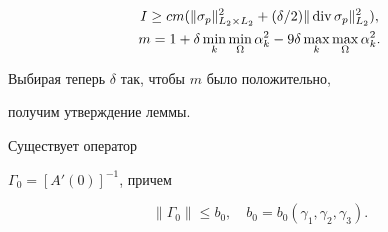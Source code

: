 \begin{pf}
\begin{gather*}
I \ge c m (\| \sigma_p \|^2_{L_2 \times L_2} + 


(\delta /2) \|\divv \sigma_p \|^2_{L_2} ),\\


m = 1 + \delta \min _k \min_ \Omega \alpha ^2_k 


- 9 \delta \max _k \max_ \Omega \alpha ^2_k. 


\end{gather*}


Выбирая теперь $ \delta $ так, чтобы $m$ было положительно,


получим утверждение леммы.


\end{pf}





\begin{lem} 


\label{Gamma0}


Существует оператор 


$\Gamma _{0} = [A'(0)]^{-1}$, причем


$$ 


\| \Gamma _{0} \| \le b_0,\quad


b_0 = b_0(\gamma _1, \gamma _2, \gamma _3).


$$


\end{lem} 






